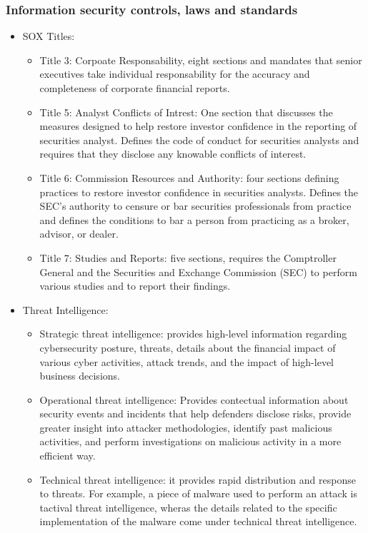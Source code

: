 \subsubsection{Information security controls, laws and standards}
\begin{itemize}
    \item SOX Titles:
    \begin{itemize}
        \item Title 3: Corpoate Responsability, eight sections and mandates that senior executives take individual responsability for the accuracy and completeness of corporate financial reports.
        \item Title 5: Analyst Conflicts of Intrest: One section that discusses the measures designed to help restore investor confidence in the reporting of securities analyst. Defines the code of conduct for securities analysts and requires that they disclose any knowable conflicts of interest.
        \item Title 6: Commission Resources and Authority: four sections defining practices to restore investor confidence in securities analysts. Defines the SEC's authority to censure or bar securities professionals from practice and defines the conditions to bar a person from practicing as a broker, advisor, or dealer.
        \item Title 7: Studies and Reports: five sections, requires the Comptroller General and the Securities and Exchange Commission (SEC) to perform various studies and to report their findings.
    \end{itemize}
    \item Threat Intelligence:
    \begin{itemize}
        \item Strategic threat intelligence: provides high-level information regarding cybersecurity posture, threats, details about the financial impact of various cyber activities, attack trends, and the impact of high-level business decisions.
        \item Operational threat intelligence: Provides contectual information about security events and incidents that help defenders disclose risks, provide greater insight into attacker methodologies, identify past malicious activities, and perform investigations on malicious activity in a more efficient way.
        \item Technical threat intelligence: it provides rapid distribution and response to threats. For example, a piece of malware used to perform an attack is tactival threat intelligence, wheras the details related to the specific implementation of the malware come under technical threat intelligence.

\end{itemize}
\end{itemize}

